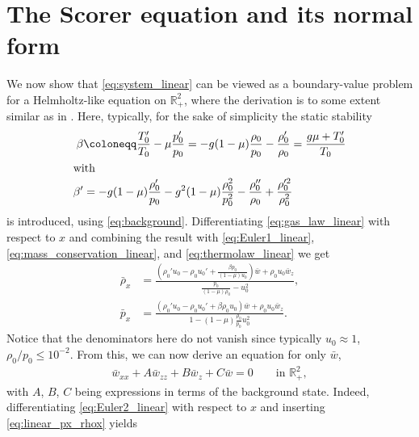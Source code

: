 \documentclass[11pt,twoside,reqno,centertags]{amsart}
\theoremstyle{definition}
\newcommand{\R}{\mathbb R}
\begin{document}
\section{The Scorer equation and its normal form}\label{sec:Scorer}
We now show that \eqref{eq:system_linear} can be viewed as a boundary-value problem for a Helmholtz-like equation on $\R^2_+$, where the derivation is to some extent similar as in \cite{Constantin23,Scorer49,Smith79}. Here, typically, for the sake of simplicity the static stability
\begin{subequations}\label{eq:beta}
	\begin{align}
		\beta&\coloneqq\frac{T_0'}{T_0}-\mu\frac{p_0'}{p_0}=-g(1-\mu)\frac{\rho_0}{p_0}-\frac{\rho_0'}{\rho_0}=\frac{g\mu+T_0'}{T_0}\\
		\intertext{with}
		\beta'&=-g(1-\mu)\frac{\rho_0'}{p_0}-g^2(1-\mu)\frac{\rho_0^2}{p_0^2}-\frac{\rho_0''}{\rho_0}+\frac{\rho_0'^2}{\rho_0^2}
	\end{align}
\end{subequations}
is introduced, using \eqref{eq:background}. Differentiating \eqref{eq:gas_law_linear} with respect to $x$ and combining the result with \eqref{eq:Euler1_linear}, \eqref{eq:mass_conservation_linear}, and \eqref{eq:thermolaw_linear} we get
\begin{subequations}\label{eq:linear_px_rhox}
	\begin{align}
		\bar\rho_x&=\frac{\left(\rho_0'u_0-\rho_0u_0'+\frac{\beta p_0}{(1-\mu)u_0}\right)\bar w +\rho_0u_0\bar w_z}{\frac{p_0}{(1-\mu)\rho_0}-u_0^2},\\
		\bar p_x&=\frac{(\rho_0'u_0-\rho_0u_0'+\beta\rho_0u_0)\bar w +\rho_0u_0\bar w_z}{1-(1-\mu)\frac{\rho_0}{p_0}u_0^2}.
	\end{align}
\end{subequations}
Notice that the denominators here do not vanish since typically $u_0\approx 1$, $\rho_0/p_0\le 10^{-2}$. From this, we can now derive an equation for only $\bar w$,
\begin{align}\label{eq:PDE_bar_w_original}
	\bar w_{xx}+A\bar w_{zz}+B\bar w_z+C\bar w=0 \qquad \text{in }\R^2_+,
\end{align}
with $A$, $B$, $C$ being expressions in terms of the background state. Indeed, differentiating \eqref{eq:Euler2_linear} with respect to $x$ and inserting \eqref{eq:linear_px_rhox} yields
\end{document}
